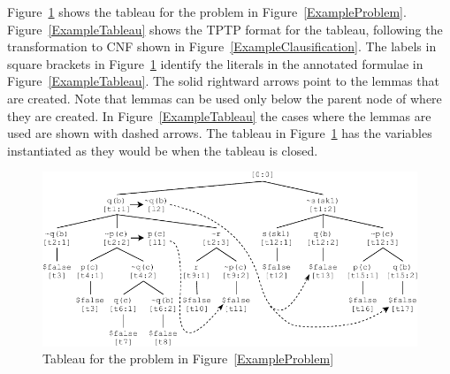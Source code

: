 \documentclass[runningheads]{llncs}
\begin{document}
Figure~\ref{TableauPicture} shows the tableau for the problem in Figure~\ref{ExampleProblem}.
Figure~\ref{ExampleTableau} shows the TPTP format for the tableau, following the transformation
to CNF shown in Figure~\ref{ExampleClausification}.
The labels in square brackets in Figure~\ref{TableauPicture} identify the literals in the 
annotated formulae in Figure~\ref{ExampleTableau}.
The solid rightward arrows point to the lemmas that are created. 
Note that lemmas can be used only below the parent node of where they are created. 
In Figure~\ref{ExampleTableau} the cases where the lemmas are used are shown with dashed arrows.
The tableau in Figure~\ref{TableauPicture} has the variables instantiated as they would be when 
the tableau is closed.

\begin{figure}[htb]
\centering
\includegraphics[width=1.0\textwidth]{Tableu_updated.pdf}
\vspace*{-1em}
\caption{Tableau for the problem in Figure~\ref{ExampleProblem}}
\label{TableauPicture}
\end{figure}
\end{document}
